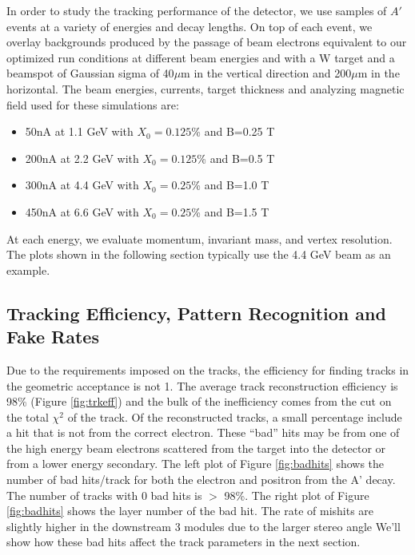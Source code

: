 \label{sec:trkperf}


In order to study the tracking performance of the detector, we use samples of $A'$ events 
at a variety of energies and decay lengths.  On top of each event, we overlay backgrounds 
produced by the passage of  beam electrons equivalent to our optimized run conditions at
different beam energies and with a W target and a beamspot of Gaussian sigma of 40$\mu$m in the vertical direction and 
200$\mu$m in the horizontal. The beam energies, currents, target thickness and analyzing magnetic field  used for these simulations are:
\begin{itemize}
\item 50nA at 1.1 GeV with $X_0=0.125$\% and  B=0.25 T
\item 200nA at 2.2 GeV with $X_0=0.125$\% and  B=0.5 T
\item 300nA at 4.4 GeV with $X_0=0.25$\% and  B=1.0 T
\item 450nA at 6.6 GeV with $X_0=0.25$\% and  B=1.5 T
\end{itemize}
At each energy, we evaluate momentum, invariant mass, and vertex resolution.  The plots shown in the following section typically use the 4.4 GeV beam as an example.  

\subsection{Tracking Efficiency, Pattern Recognition and Fake Rates}

Due to the requirements imposed on the tracks, the efficiency for finding tracks in the 
geometric acceptance is not 1. The average track reconstruction efficiency is 98\% (Figure \ref{fig:trkeff}) and 
the bulk of the inefficiency comes from the cut on the total $\chi^2$ of the track. 
Of the reconstructed tracks, a small percentage include a hit that is not from 
the correct electron.  These ``bad'' hits may be from one of the high energy beam 
electrons scattered from the target into the detector or from a lower energy secondary.  
The left plot of Figure \ref{fig:badhits} shows the number of bad hits/track for both the electron 
and positron from the A' decay.  The number of tracks with 0 bad hits is $>$ 98\%.
The right plot of Figure \ref{fig:badhits} shows the layer number of the bad hit.  
The rate of mishits are slightly higher in the downstream 3 modules due to the larger stereo angle %
We'll show how these bad hits affect the track parameters in the next section.


